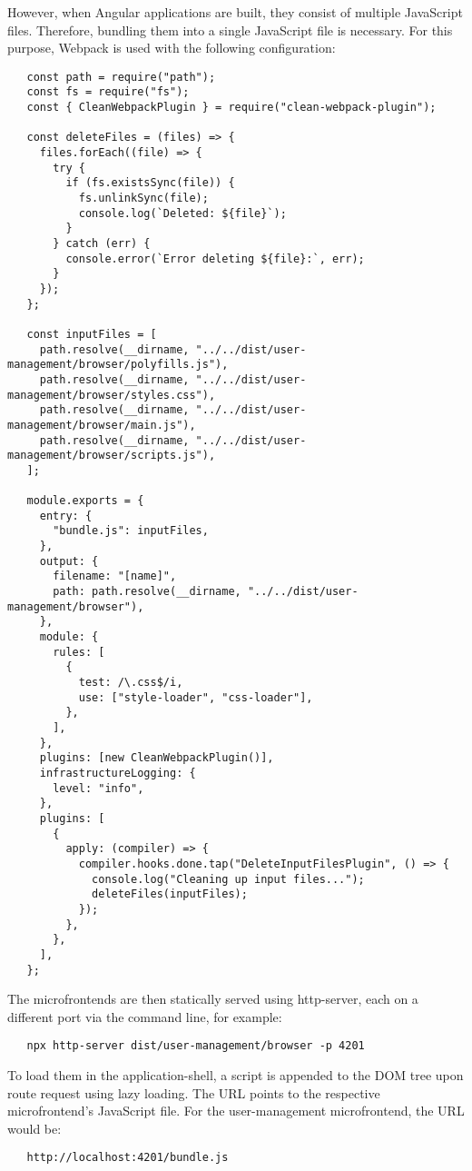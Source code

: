 \noindent
However, when Angular applications are built, they consist of multiple JavaScript files. Therefore, bundling them into a single JavaScript file is necessary. For this purpose, Webpack is used with the following configuration:
\begin{verbatim}
   const path = require("path");
   const fs = require("fs");
   const { CleanWebpackPlugin } = require("clean-webpack-plugin");
   
   const deleteFiles = (files) => {
     files.forEach((file) => {
       try {
         if (fs.existsSync(file)) {
           fs.unlinkSync(file);
           console.log(`Deleted: ${file}`);
         }
       } catch (err) {
         console.error(`Error deleting ${file}:`, err);
       }
     });
   };
   
   const inputFiles = [
     path.resolve(__dirname, "../../dist/user-management/browser/polyfills.js"),
     path.resolve(__dirname, "../../dist/user-management/browser/styles.css"),
     path.resolve(__dirname, "../../dist/user-management/browser/main.js"),
     path.resolve(__dirname, "../../dist/user-management/browser/scripts.js"),
   ];
   
   module.exports = {
     entry: {
       "bundle.js": inputFiles,
     },
     output: {
       filename: "[name]",
       path: path.resolve(__dirname, "../../dist/user-management/browser"),
     },
     module: {
       rules: [
         {
           test: /\.css$/i,
           use: ["style-loader", "css-loader"],
         },
       ],
     },
     plugins: [new CleanWebpackPlugin()],
     infrastructureLogging: {
       level: "info",
     },
     plugins: [
       {
         apply: (compiler) => {
           compiler.hooks.done.tap("DeleteInputFilesPlugin", () => {
             console.log("Cleaning up input files...");
             deleteFiles(inputFiles);
           });
         },
       },
     ],
   };
\end{verbatim}

\noindent
The microfrontends are then statically served using http-server, each on a different port via the command line, for example:
\begin{verbatim}
   npx http-server dist/user-management/browser -p 4201
\end{verbatim}
To load them in the application-shell, a script is appended to the DOM tree upon route request using lazy loading. The URL points to the respective microfrontend's JavaScript file. For the user-management microfrontend, the URL would be:
\begin{verbatim}
   http://localhost:4201/bundle.js
\end{verbatim}